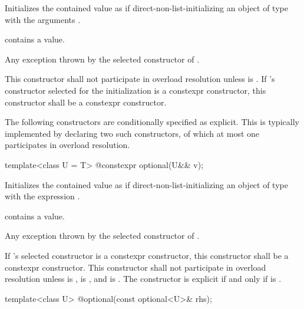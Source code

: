 \begin{itemdescr}
\pnum
\effects
Initializes the contained value as if direct-non-list-initializing an object of type  with the arguments .

\pnum
\postconditions
{} contains a value.

\pnum
\throws
Any exception thrown by the selected constructor of .

\pnum
\remarks
This constructor shall not participate in overload resolution unless  is .
If 's constructor selected for the initialization is a constexpr constructor, this constructor shall be a constexpr constructor.
\end{itemdescr}

\pnum
\begin{note}
The following constructors are conditionally specified as explicit.
This is typically implemented by declaring two such constructors,
of which at most one participates in overload resolution.
\end{note}

%
\begin{itemdecl}
template<class U = T> @\EXPLICIT@ constexpr optional(U&& v);
\end{itemdecl}

\begin{itemdescr}
\pnum
\effects
Initializes the contained value as if direct-non-list-initializing
an object of type  with the expression .

\pnum
\postconditions
{} contains a value.

\pnum
\throws
Any exception thrown by the selected constructor of .

\pnum
\remarks
If 's selected constructor is a constexpr constructor,
this constructor shall be a constexpr constructor.
This constructor shall not participate in overload resolution unless
 is ,
 is , and
 is .
The constructor is explicit if and only if
 is .
\end{itemdescr}

%
\begin{itemdecl}
template<class U> @\EXPLICIT@ optional(const optional<U>& rhs);
\end{itemdecl}


